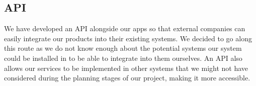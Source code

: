 \documentclass{article}
\begin{document}
    \subsection{API}
    We have developed an API alongside our apps so that external companies can easily integrate our products into their existing systems. We decided to go along this route as we do not know enough about the potential systems our system could be installed in to be able to integrate into them ourselves. An API also allows our services to be implemented in other systems that we might not have considered during the planning stages of our project, making it more accessible.
\end{document}
